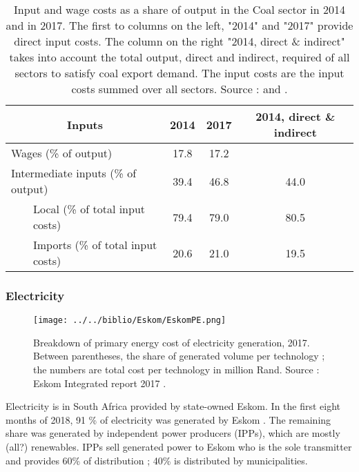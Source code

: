 \documentclass[12pt,english]{article}
\begin{document}
\begin{table}[ht]
	\centering
	\renewcommand*{\arraystretch}{1.15}
	\begin{tabular}{lp{20pt}lcc | c}
		\toprule
		\multicolumn{3}{c}{Inputs} & 2014 & 2017 & 2014, direct \& indirect\\ 
		\midrule
		\multicolumn{3}{l}{Wages (\% of output)}  		 & 17.8 & 17.2 &  \\ 	
		\multicolumn{3}{l}{Intermediate inputs (\% of output)}  & 39.4  & 46.8  & 44.0 \\ 
		& 						 & Local (\% of total input costs) & 79.4 &  79.0 &  80.5\\ 
		& 						 & Imports (\% of total input costs) & 20.6 &  21.0  & 19.5 \\
		\bottomrule
	\end{tabular}
	\caption{\label{costShares_2014_2017}\small Input and wage costs as a share of output in the Coal sector in 2014 and in 2017. The first to columns on the left, "2014" and "2017" provide direct input costs. The column on the right "2014, direct \& indirect" takes into account the total output, direct and indirect, required of all sectors to satisfy coal export demand. The input costs are the input costs summed over all sectors. Source : \cite{IOT2014} and \cite{MineralsCouncil2018Facts}.}
\end{table}


\subsubsection{Electricity}

\begin{figure}[!h]
	\centering
	\texttt{[image: ../../biblio/Eskom/EskomPE.png]}
	\caption{\label{Eskom2017PE}Breakdown of primary energy cost of electricity generation, 2017. Between parentheses, the share of generated volume per technology ; the numbers are total cost per technology in million Rand. Source : Eskom Integrated report 2017 \citep{Eskom2017AR}.}
\end{figure}

Electricity is in South Africa provided by state-owned Eskom. In the first eight months of 2018, 91 \% of electricity was generated by Eskom \citep{P4141_201808}. The remaining share was generated by independent power producers (IPPs), which are mostly (all?) renewables. IPPs sell generated power to Eskom who is the sole transmitter and provides 60\% of distribution ; 40\% is distributed by municipalities.
\end{document}
